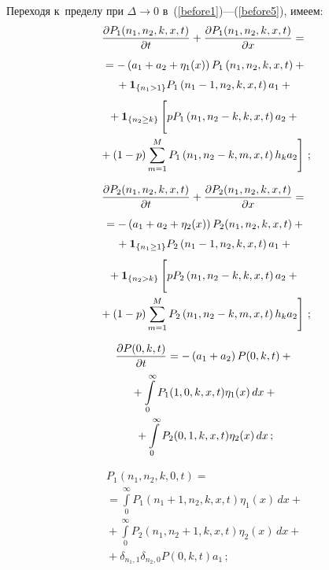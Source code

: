 \begin{multicols}{2}
Переходя к~пределу при $\Delta\to 0$ в~(\ref{before1})---(\ref{before5}), имеем:
\begin{multline}
\fr{\partial P_1(n_1,n_2,k,x,t)}{\partial t}+
\fr{\partial P_1(n_1,n_2,k,x,t)}{\partial x}={}\\[3pt]
{}=
-\left(a_1+a_2+\eta_1(x)\right)P_1\left(n_1,n_2,k,x,t\right)+{}\\[3pt]
{}+\mathbf{1}_{\{n_1>1\}}P_1\left(n_1-1,n_2,k,x,t\right)a_1+{}\\[3pt]
{}+\mathbf{1}_{\{n_2\geq k\}}\left[
\vphantom{\sum\limits_{m=1}^{M}}
pP_1\left(n_1,n_2-k,k,x,t\right)a_2+{}\right.\\
\left.{}+(1-p)\sum\limits_{m=1}^{M}
P_1\left(n_1,n_2-k,m,x,t\right)h_k a_2\right]\,;
\label{after1}
\end{multline}

\vspace*{-10pt}

\noindent
\begin{multline}
\fr{\partial P_2(n_1,n_2,k,x,t)}{\partial t}+
\fr{\partial P_2(n_1,n_2,k,x,t)}{\partial x}={}\\[3pt]
{}=
-\left(a_1+a_2+\eta_2(x)\right)P_2(n_1,n_2,k,x,t)+{}\\[3pt]
{}+\mathbf{1}_{\{n_1\geq 1\}}P_2\left(n_1-1,n_2,k,x,t\right)a_1+{}\\[3pt]
{}+\mathbf{1}_{\{n_2>k\}}\left[
\vphantom{\sum\limits_{m=1}^{M}}
pP_2\left(n_1,n_2-k,k,x,t\right)a_2+{}\right.\\
\left.{}+(1-p)\sum\limits_{m=1}^{M}
P_2\left(n_1,n_2-k,m,x,t\right)h_k a_2\right]\,;
\label{after2}
\end{multline}

\vspace*{-12pt}

\noindent
\begin{multline}
\displaystyle\frac{\displaystyle \partial P(0,k,t)\mathstrut}{\displaystyle \partial t\mathstrut}=
-\left(a_1+a_2\right)P(0,k,t)+{}\\
{}+\int\limits_0^{\infty}P_1(1,0,k,x,t)\eta_1(x)\,dx+{}\\
{}+\int\limits_0^{\infty}P_2(0,1,k,x,t)\eta_2(x)\,dx\,;
\label{after3}
\end{multline}


\noindent
\begin{multline}
P_1\left(n_1,n_2,k,0,t\right)={}\\
{}=
\int\limits_0^{\infty}P_1\left(n_1+1,n_2,k,x,t\right)\eta_1(x)\,dx+{}\\
{}+\int\limits_0^{\infty}P_2\left(n_1,n_2+1,k,x,t\right)\eta_2(x)\,dx+{}\\
{}+
\delta_{n_1,1}\delta_{n_2,0}P(0,k,t)a_1\,;
\label{after4}
\end{multline}


\end{multicols}
